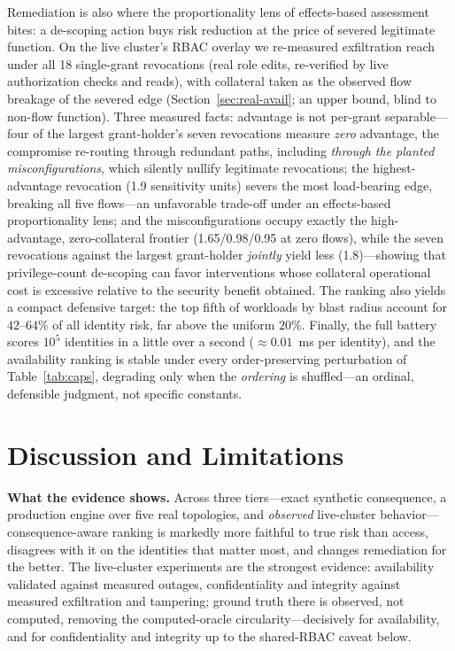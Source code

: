 \documentclass[conference]{IEEEtran}
\begin{document}
Remediation is also where the proportionality lens of effects-based
assessment~\cite{maathuis18,maathuis21} bites: a de-scoping action buys risk reduction
at the price of severed legitimate function. On the live cluster's RBAC overlay we
re-measured exfiltration reach under all 18 single-grant revocations (real role edits,
re-verified by live authorization checks and reads), with collateral taken as the
observed flow breakage of the severed edge (Section~\ref{sec:real-avail}; an upper
bound, blind to non-flow function). Three measured facts: advantage is not per-grant
separable---four of the largest grant-holder's seven revocations measure \emph{zero}
advantage, the compromise re-routing through redundant paths, including \emph{through
the planted misconfigurations}, which silently nullify legitimate revocations; the
highest-advantage revocation (1.9 sensitivity units) severs the most load-bearing edge,
breaking all five flows---an unfavorable trade-off under an effects-based
proportionality lens; and the misconfigurations occupy exactly the high-advantage,
zero-collateral frontier (1.65/0.98/0.95 at zero flows), while the seven revocations
against the largest grant-holder \emph{jointly} yield less (1.8)---showing that
privilege-count de-scoping can favor interventions whose collateral operational cost is
excessive relative to the security benefit obtained. The ranking also yields a compact defensive
target: the top fifth of workloads by blast radius account for $42$--$64\%$ of all
identity risk, far above the uniform $20\%$. Finally, the full battery scores $10^5$ identities in a little over a second
($\approx 0.01$~ms per identity), and the availability ranking is stable under every
order-preserving perturbation of Table~\ref{tab:caps}, degrading only when the
\emph{ordering} is shuffled---an ordinal, defensible judgment, not specific constants.



\section{Discussion and Limitations}
\label{sec:disc}
\textbf{What the evidence shows.} Across three tiers---exact synthetic consequence, a
production engine over five real topologies, and \emph{observed} live-cluster
behavior---consequence-aware ranking is markedly more faithful to true risk than access,
disagrees with it on the identities that matter most, and changes remediation for the
better. The live-cluster experiments are the strongest evidence: availability validated
against measured outages, confidentiality and integrity against measured exfiltration
and tampering; ground truth there is observed, not computed, removing the
computed-oracle circularity---decisively for availability, and for confidentiality and
integrity up to the shared-RBAC caveat below.
\end{document}
